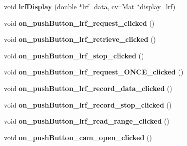\begin{DoxyCompactItemize}
\item 
\hypertarget{class_main_window_ac0f5decb67a200a028da33ea7e22323b}{}void {\bfseries lrf\+Display} (double $\ast$lrf\+\_\+data, cv\+::\+Mat $\ast$\hyperlink{class_main_window_a526afc9bb96e26cccbc074ed30c7c386}{display\+\_\+lrf})\label{class_main_window_ac0f5decb67a200a028da33ea7e22323b}

\item 
\hypertarget{class_main_window_abe620c8361efe98ca34a574c1e3bb23a}{}void {\bfseries on\+\_\+push\+Button\+\_\+lrf\+\_\+request\+\_\+clicked} ()\label{class_main_window_abe620c8361efe98ca34a574c1e3bb23a}

\item 
\hypertarget{class_main_window_a0eeb2e8245dab36d1555374f38f90b0e}{}void {\bfseries on\+\_\+push\+Button\+\_\+lrf\+\_\+retrieve\+\_\+clicked} ()\label{class_main_window_a0eeb2e8245dab36d1555374f38f90b0e}

\item 
\hypertarget{class_main_window_a978525da6f1ffd7d028e614cb54a28f8}{}void {\bfseries on\+\_\+push\+Button\+\_\+lrf\+\_\+stop\+\_\+clicked} ()\label{class_main_window_a978525da6f1ffd7d028e614cb54a28f8}

\item 
\hypertarget{class_main_window_ad69d20e6e49f01f56636ac2f23420120}{}void {\bfseries on\+\_\+push\+Button\+\_\+lrf\+\_\+request\+\_\+\+O\+N\+C\+E\+\_\+clicked} ()\label{class_main_window_ad69d20e6e49f01f56636ac2f23420120}

\item 
\hypertarget{class_main_window_ad64bbcfe72cae71d26d03ccd11d56787}{}void {\bfseries on\+\_\+push\+Button\+\_\+lrf\+\_\+record\+\_\+data\+\_\+clicked} ()\label{class_main_window_ad64bbcfe72cae71d26d03ccd11d56787}

\item 
\hypertarget{class_main_window_a22c8c805835969894435ddd7e56db854}{}void {\bfseries on\+\_\+push\+Button\+\_\+lrf\+\_\+record\+\_\+stop\+\_\+clicked} ()\label{class_main_window_a22c8c805835969894435ddd7e56db854}

\item 
\hypertarget{class_main_window_a32c1032023f0ceebb217ca49ae94783b}{}void {\bfseries on\+\_\+push\+Button\+\_\+lrf\+\_\+read\+\_\+range\+\_\+clicked} ()\label{class_main_window_a32c1032023f0ceebb217ca49ae94783b}

\item 
\hypertarget{class_main_window_ad9fb96fc74a34efed0f99274c02fc7d9}{}void {\bfseries on\+\_\+push\+Button\+\_\+cam\+\_\+open\+\_\+clicked} ()\label{class_main_window_ad9fb96fc74a34efed0f99274c02fc7d9}


\end{DoxyCompactItemize}
